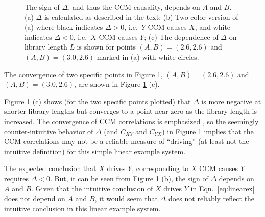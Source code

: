 \documentclass[twocolumn,aps,pre,groupedaddress]{revtex4-1}
\begin{document}
\begin{figure}[ht]
\begin{tabular}{l}
\end{tabular}
\caption{The sign of $\Delta$, and thus the CCM causality, depends on $A$ and $B$. (a) $\Delta$ is calculated as described in the text; (b) Two-color version of (a) where black indicates $\Delta>0$, i.e.\ $Y$ CCM causes $X$, and white indicates $\Delta<0$, i.e.\ $X$ CCM causes $Y$; (c) The dependence of $\Delta$ on library length $L$ is shown for points $(A,B) = (2.6,2.6)$ and $(A,B)=(3.0,2.6)$ marked in (a) with white circles.}
\label{fig:linearex1}
\end{figure}
The convergence of two specific points in Figure \ref{fig:linearex1}, $(A,B) = (2.6,2.6)$ and $(A,B)=(3.0,2.6)$, are shown in Figure \ref{fig:linearex1} (c).

Figure \ref{fig:linearex1} (c) shows (for the two specific points plotted) that $\Delta$ is more negative at shorter library lengths but converges to a point near zero as the library length is increased.  The convergence of CCM correlations is emphasized \cite{Sugihara2012}, so the seemingly counter-intuitive behavior of $\Delta$ (and $C_{XY}$ and $C_{YX}$) in Figure \ref{fig:linearex1} implies that the CCM correlations may not be a reliable measure of ``driving'' (at least not the intuitive definition) for this simple linear example system.

The expected conclusion that $X$ drives $Y$, corresponding to $X$ CCM causes $Y$ requires $\Delta<0$.  But, it can be seen from Figure \ref{fig:linearex1} (b), the sign of $\Delta$ depends on $A$ and $B$.  Given that the intuitive conclusion of $X$ drives $Y$ in Eqn.\ \ref{eq:linearex} does not depend on $A$ and $B$, it would seem that $\Delta$ does not reliably reflect the intuitive conclusion in this linear example system.  
\end{document}
